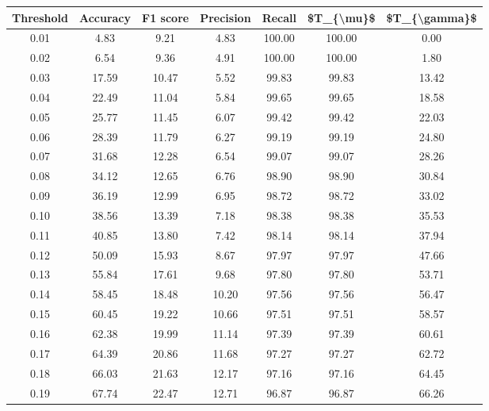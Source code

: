 \begin{tabular}{|c|c|c|c|c|c|c|}
\toprule
 Threshold &  Accuracy &  F1 score &  Precision &  Recall &  \$T\_\{\textbackslash mu\}\$ &  \$T\_\{\textbackslash gamma\}\$ \\
\hline
      0.01 &      4.83 &      9.21 &       4.83 &  100.00 &     100.00 &          0.00 \\
      0.02 &      6.54 &      9.36 &       4.91 &  100.00 &     100.00 &          1.80 \\
      0.03 &     17.59 &     10.47 &       5.52 &   99.83 &      99.83 &         13.42 \\
      0.04 &     22.49 &     11.04 &       5.84 &   99.65 &      99.65 &         18.58 \\
      0.05 &     25.77 &     11.45 &       6.07 &   99.42 &      99.42 &         22.03 \\
      0.06 &     28.39 &     11.79 &       6.27 &   99.19 &      99.19 &         24.80 \\
      0.07 &     31.68 &     12.28 &       6.54 &   99.07 &      99.07 &         28.26 \\
      0.08 &     34.12 &     12.65 &       6.76 &   98.90 &      98.90 &         30.84 \\
      0.09 &     36.19 &     12.99 &       6.95 &   98.72 &      98.72 &         33.02 \\
      0.10 &     38.56 &     13.39 &       7.18 &   98.38 &      98.38 &         35.53 \\
      0.11 &     40.85 &     13.80 &       7.42 &   98.14 &      98.14 &         37.94 \\
      0.12 &     50.09 &     15.93 &       8.67 &   97.97 &      97.97 &         47.66 \\
      0.13 &     55.84 &     17.61 &       9.68 &   97.80 &      97.80 &         53.71 \\
      0.14 &     58.45 &     18.48 &      10.20 &   97.56 &      97.56 &         56.47 \\
      0.15 &     60.45 &     19.22 &      10.66 &   97.51 &      97.51 &         58.57 \\
      0.16 &     62.38 &     19.99 &      11.14 &   97.39 &      97.39 &         60.61 \\
      0.17 &     64.39 &     20.86 &      11.68 &   97.27 &      97.27 &         62.72 \\
      0.18 &     66.03 &     21.63 &      12.17 &   97.16 &      97.16 &         64.45 \\
      0.19 &     67.74 &     22.47 &      12.71 &   96.87 &      96.87 &         66.26 \\

\end{tabular}
